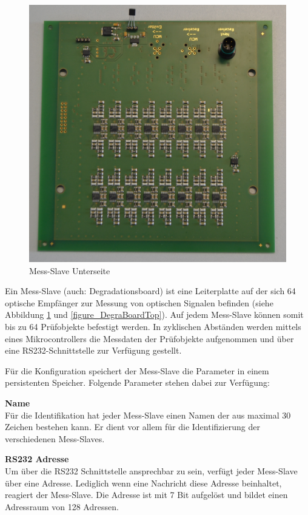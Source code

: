 \begin{figure}[H]
  \includegraphics[width=\linewidth]{img/general/DegraBoardBottom.jpg}
  \caption{Mess-Slave Unterseite}\label{figure_DegraBoardBottom}
\endminipage
\end{figure}

Ein Mess-Slave (auch: Degradationsboard) ist eine Leiterplatte auf der sich 64 optische Empfänger zur Messung von optischen Signalen befinden (siehe Abbildung \ref{figure_DegraBoardBottom} und \ref{figure_DegraBoardTop}). Auf jedem Mess-Slave können somit bis zu 64 Prüfobjekte befestigt werden. In zyklischen Abständen werden mittels eines Mikrocontrollers die Messdaten der Prüfobjekte aufgenommen und über eine RS232-Schnittstelle zur Verfügung gestellt.\ 

Für die Konfiguration speichert der Mess-Slave die Parameter in einem persistenten Speicher. Folgende Parameter stehen dabei zur Verfügung:

\textbf{Name}\\
Für die Identifikation hat jeder Mess-Slave einen Namen der aus maximal 30 Zeichen bestehen kann. Er dient vor allem für die Identifizierung der verschiedenen Mess-Slaves.\ 

\textbf{RS232 Adresse}\\
Um über die RS232 Schnittstelle ansprechbar zu sein, verfügt jeder Mess-Slave über eine Adresse. Lediglich wenn eine Nachricht diese Adresse beinhaltet, reagiert der Mess-Slave. Die Adresse ist mit 7 Bit aufgelöst und bildet einen Adressraum von 128 Adressen.\ 

